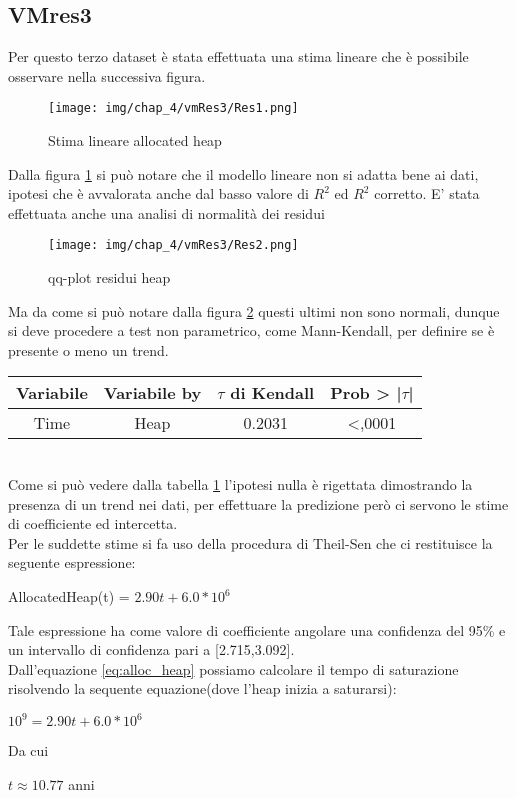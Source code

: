 \subsection{VMres3}
Per questo terzo dataset è stata effettuata una stima lineare che è possibile osservare nella successiva figura.
\begin{figure}[H]
    \centering
    \texttt{[image: img/chap\_4/vmRes3/Res1.png]}
    \caption{Stima lineare allocated heap}
    \label{fig:stim_lin_VmRes1}
\end{figure}
\noindent
Dalla figura \ref{fig:stim_lin_VmRes1} si può notare che il modello lineare non si adatta bene ai dati, ipotesi che è avvalorata anche dal basso valore di $R^2$ ed $R^2$ corretto.
E' stata effettuata anche una analisi di normalità dei residui
\begin{figure}[H]
    \centering
    \texttt{[image: img/chap\_4/vmRes3/Res2.png]}
    \caption{qq-plot residui heap}
    \label{fig:qq_plot_VmRes1}
\end{figure}
Ma da come si può notare dalla figura \ref{fig:qq_plot_VmRes1} questi ultimi non sono normali, dunque si deve procedere a test non parametrico, come Mann-Kendall, per definire se è presente o meno un trend.\\
\begin{table}[htbp]
    \centering
    \label{tab:Mann-kendall}
    \begin{tabular}{|c|c|c|c|} %
        \hline
        Variabile & Variabile by & $\tau$ di Kendall &Prob > |$\tau$| \\ %
        \hline
        Time & Heap & 0.2031 & <,0001\\
        \hline
    \end{tabular}
\end{table}
\\
Come si può vedere dalla tabella \ref{tab:Mann-kendall} l'ipotesi nulla è rigettata dimostrando la presenza di un trend nei dati, per effettuare la predizione però ci servono le stime di coefficiente ed intercetta.\\
Per le suddette stime si fa uso della procedura di Theil-Sen che ci restituisce la seguente espressione:
\begin{center}
   AllocatedHeap(t) = $2.90t + 6.0*10^6$
   \label{eq:alloc_heap}
\end{center}
Tale espressione ha come valore di coefficiente angolare una confidenza del 95\% e un intervallo di confidenza pari a [2.715,3.092].\\
Dall'equazione \ref{eq:alloc_heap} possiamo calcolare il tempo di saturazione risolvendo la sequente equazione(dove l'heap inizia a saturarsi):
\begin{center}
    $
    10^9 = 2.90t+6.0*10^6
    $\\
\end{center}
Da cui 
\begin{center}
    $
    t \approx 10.77$ anni
\end{center}